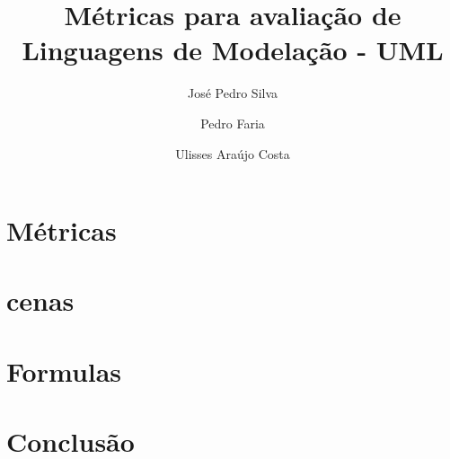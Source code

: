 \documentclass[10pt]{article}
\title{\sf  Métricas para avaliação de Linguagens de Modelação - UML}
\author{ José Pedro Silva \and Pedro Faria \and Ulisses Araújo Costa }
\date{}
\begin{document}
\maketitle


\section{Métricas}


\section{cenas}

\section{Formulas}


\section{Conclusão}

{}

\end{document}
